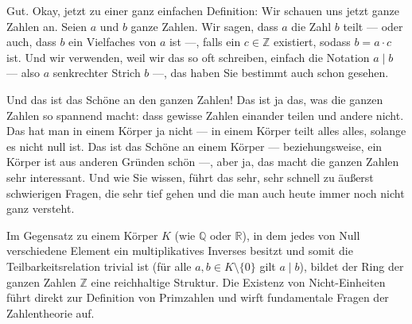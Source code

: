 \begin{spoken-clean}[00:03:53 - 00:05:44]
Gut. Okay, jetzt zu einer ganz einfachen Definition: Wir schauen uns jetzt ganze Zahlen an. Seien $a$ und $b$ ganze Zahlen. Wir sagen, dass $a$ die Zahl $b$ teilt --- oder auch, dass $b$ ein Vielfaches von $a$ ist ---, falls ein $c \in \mathbb{Z}$ existiert, sodass $b = a \cdot c$ ist. Und wir verwenden, weil wir das so oft schreiben, einfach die Notation $a \mid b$ --- also $a$ senkrechter Strich $b$ ---, das haben Sie bestimmt auch schon gesehen.
\end{spoken-clean}

\begin{math-stroke}
\end{math-stroke}

\begin{spoken-clean}[00:05:44 - 00:07:09]
Und das ist das Schöne an den ganzen Zahlen! Das ist ja das, was die ganzen Zahlen so spannend macht: dass gewisse Zahlen einander teilen und andere nicht. Das hat man in einem Körper ja nicht --- in einem Körper teilt alles alles, solange es nicht null ist. Das ist das Schöne an einem Körper --- beziehungsweise, ein Körper ist aus anderen Gründen schön ---, aber ja, das macht die ganzen Zahlen sehr interessant. Und wie Sie wissen, führt das sehr, sehr schnell zu äußerst schwierigen Fragen, die sehr tief gehen und die man auch heute immer noch nicht ganz versteht.
\end{spoken-clean}

\begin{didactic-insight}
Im Gegensatz zu einem Körper $K$ (wie $\mathbb{Q}$ oder $\mathbb{R}$), in dem jedes von Null verschiedene Element ein multiplikatives Inverses besitzt und somit die Teilbarkeitsrelation trivial ist (für alle $a, b \in K \setminus \{0\}$ gilt $a \mid b$), bildet der Ring der ganzen Zahlen $\mathbb{Z}$ eine reichhaltige Struktur. Die Existenz von Nicht-Einheiten führt direkt zur Definition von Primzahlen und wirft fundamentale Fragen der Zahlentheorie auf.
\end{didactic-insight}

